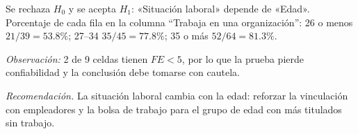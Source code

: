 Se rechaza $H_0$ y se acepta $H_1$: «Situación laboral» depende de «Edad». Porcentaje de cada fila en la columna ``Trabaja en una organización'': 26 o menos $21/39 = 53.8\%$; 27–34 $35/45 = 77.8\%$; 35 o más $52/64 = 81.3\%$.

\textit{Observación:} 2 de 9 celdas tienen $FE < 5$, por lo que la prueba pierde confiabilidad y la conclusión debe tomarse con cautela.

\textit{Recomendación.} La situación laboral cambia con la edad: reforzar la vinculación con empleadores y la bolsa de trabajo para el grupo de edad con más titulados sin trabajo.

